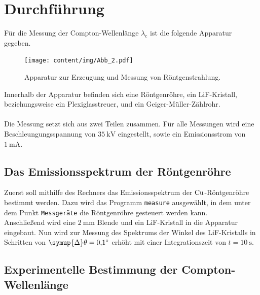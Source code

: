\section{Durchführung}
\label{sec:durchführung}

    Für die Messung der Compton-Wellenlänge $\lambda_\text{c}$ ist die folgende Apparatur gegeben.
    \begin{figure}[H]
        \centering
        \texttt{[image: content/img/Abb\_2.pdf]}
        \caption{Apparatur zur Erzeugung und Messung von Röntgenstrahlung.}
        \label{fig:aufbau_röntgen}
    \end{figure}
    Innerhalb der Apparatur befinden sich eine Röntgenröhre,
    ein LiF-Kristall, beziehungsweise ein Plexiglasstreuer,
    und ein Geiger-Müller-Zählrohr.\\
    \\
    Die Messung setzt sich aus zwei Teilen zusammen.
    Für alle Messungen wird eine Beschleungungsspannung von $\SI{35}{\kilo\volt}$ eingestellt,
    sowie ein Emissionsstrom von $\SI{1}{\milli\ampere}$.

\subsection{Das Emissionsspektrum der Röntgenröhre}

    Zuerst soll mithilfe des Rechners das Emissionsspektrum der $\ce{Cu}$-Röntgenröhre bestimmt werden.
    Dazu wird das Programm \texttt{measure} ausgewählt,
    in dem unter dem Punkt \texttt{Messgeräte} die Röntgenröhre gesteuert werden kann.\\
    Anschließend wird eine $\SI{2}{\milli\meter}$ Blende und ein LiF-Kristall in die Apparatur eingebaut.
    Nun wird zur Messung des Spektrums der Winkel des LiF-Kristalls in Schritten von $\symup{\Delta}\theta = \SI{0.1}{\degree}$ erhöht mit einer Integrationszeit von $t = \SI{10}{\second}$.

\subsection{Experimentelle Bestimmung der Compton-Wellenlänge}

